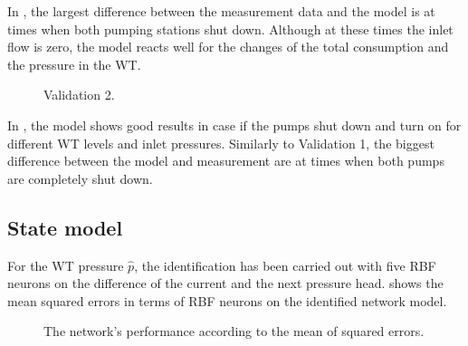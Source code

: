  \vspace{-4mm}

 In , the largest difference between the measurement data and the model is at times when both pumping stations shut down. Although at these times the inlet flow is zero, the model reacts well for the changes of the total consumption and the pressure in the WT.

  \vspace{-2mm}

 \begin{figure}[H]
 \centering
  
 \vspace{-2.5mm}
 \caption{Validation 2.}
 \label{fig:pk_v2_ident}
 \end{figure}

 \vspace{-4mm}

In , the model shows good results in case if the pumps shut down and turn on for different WT levels and inlet pressures. Similarly to Validation 1, the biggest difference between the model and measurement are at times when both pumps are completely shut down. 

 \subsection{State model}
 \label{state_model}

For the WT pressure $\hat{p}$, the identification has been carried out with five RBF neurons on the difference of the current and the next pressure head. shows the mean squared errors in terms of RBF neurons on the identified network model.

\vspace{-1mm}

 \begin{figure}[H]
 \centering
  
 \vspace{-3.5mm}
 \caption{The network’s performance according to the mean of squared errors.}
 \label{fig:MSE_state}
 \end{figure}

 \vspace{-3mm}

